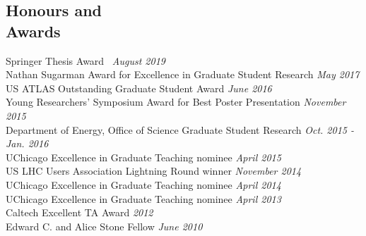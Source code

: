 \documentclass[margin,line]{resume}
\let\origsection\section%
\let\section\subsection%
\let\section\origsection%
\begin{document}
\begin{resume}
\newpage


\section{\mysidestyle Honours and\\Awards}

Springer Thesis Award~\cite{Stark2020} \hfill \textsl{August 2019}\\
Nathan Sugarman Award for Excellence in Graduate Student Research \hfill \textsl{May 2017}\\
US ATLAS Outstanding Graduate Student Award \hfill \textsl{June 2016}\\
Young Researchers' Symposium Award for Best Poster Presentation \hfill \textsl{November 2015}\\
Department of Energy, Office of Science Graduate Student Research \hfill \textsl{Oct. 2015 - Jan. 2016}\\
UChicago Excellence in Graduate Teaching nominee \hfill \textsl{April 2015}\\
US LHC Users Association Lightning Round winner \hfill \textsl{November 2014}\\
UChicago Excellence in Graduate Teaching nominee \hfill \textsl{April 2014}\\
UChicago Excellence in Graduate Teaching nominee \hfill \textsl{April 2013}\\
Caltech Excellent TA Award \hfill \textsl{2012}\\
Edward C. and Alice Stone Fellow \hfill \textsl{June 2010}




\end{resume}
\end{document}
